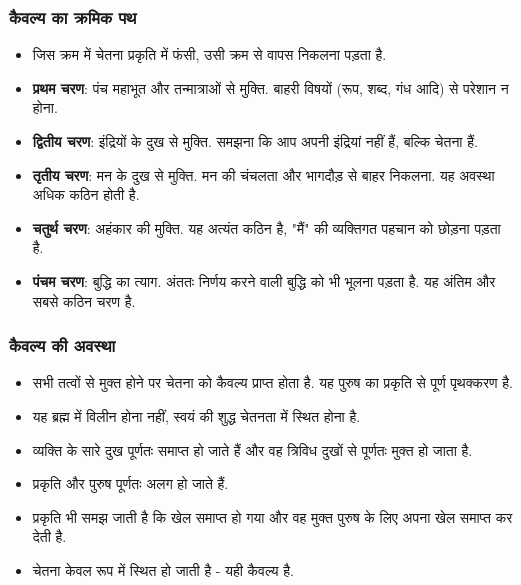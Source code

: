 \begin{frame}[fragile]\frametitle{कैवल्य का क्रमिक पथ}
      \begin{itemize}
          \item जिस क्रम में चेतना प्रकृति में फंसी, उसी क्रम से वापस निकलना पड़ता है.
          \item \textbf{प्रथम चरण}: पंच महाभूत और तन्मात्राओं से मुक्ति. बाहरी विषयों (रूप, शब्द, गंध आदि) से परेशान न होना.
          \item \textbf{द्वितीय चरण}: इंद्रियों के दुख से मुक्ति. समझना कि आप अपनी इंद्रियां नहीं हैं, बल्कि चेतना हैं.
          \item \textbf{तृतीय चरण}: मन के दुख से मुक्ति. मन की चंचलता और भागदौड़ से बाहर निकलना. यह अवस्था अधिक कठिन होती है.
          \item \textbf{चतुर्थ चरण}: अहंकार की मुक्ति. यह अत्यंत कठिन है, "मैं" की व्यक्तिगत पहचान को छोड़ना पड़ता है.
          \item \textbf{पंचम चरण}: बुद्धि का त्याग. अंततः निर्णय करने वाली बुद्धि को भी भूलना पड़ता है. यह अंतिम और सबसे कठिन चरण है.
      \end{itemize}
\end{frame}

\begin{frame}[fragile]\frametitle{कैवल्य की अवस्था}
      \begin{itemize}
          \item सभी तत्वों से मुक्त होने पर चेतना को कैवल्य प्राप्त होता है. यह पुरुष का प्रकृति से पूर्ण पृथक्करण है.
          \item यह ब्रह्म में विलीन होना नहीं, स्वयं की शुद्ध चेतनता में स्थित होना है.
          \item व्यक्ति के सारे दुख पूर्णतः समाप्त हो जाते हैं और वह त्रिविध दुखों से पूर्णतः मुक्त हो जाता है.
          \item प्रकृति और पुरुष पूर्णतः अलग हो जाते हैं.
          \item प्रकृति भी समझ जाती है कि खेल समाप्त हो गया और वह मुक्त पुरुष के लिए अपना खेल समाप्त कर देती है.
          \item चेतना केवल रूप में स्थित हो जाती है - यही कैवल्य है.
      \end{itemize}
\end{frame}

